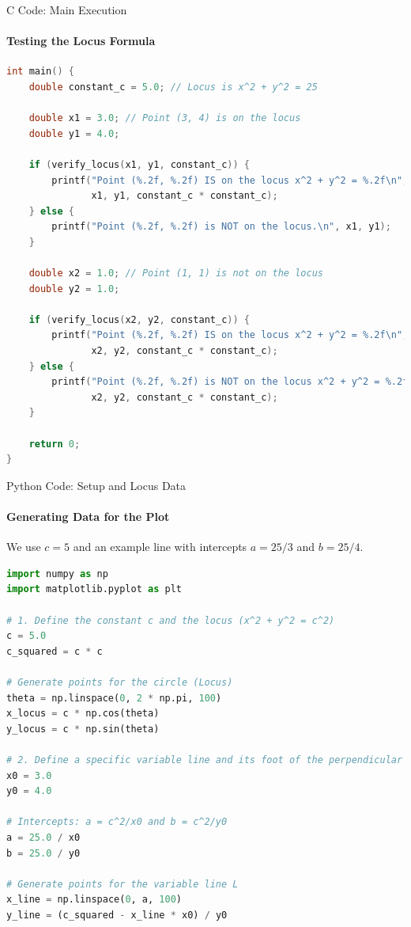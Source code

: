 \documentclass{beamer}
\begin{document}
\begin{frame}[fragile]{C Code: Main Execution}
    \framesubtitle{Testing the Locus Formula}
    
    \lstset{style=CStyle}
    \begin{lstlisting}[language=C, firstnumber=14]
int main() {
    double constant_c = 5.0; // Locus is x^2 + y^2 = 25

    double x1 = 3.0; // Point (3, 4) is on the locus
    double y1 = 4.0;
    
    if (verify_locus(x1, y1, constant_c)) {
        printf("Point (%.2f, %.2f) IS on the locus x^2 + y^2 = %.2f\n", 
               x1, y1, constant_c * constant_c);
    } else {
        printf("Point (%.2f, %.2f) is NOT on the locus.\n", x1, y1);
    }

    double x2 = 1.0; // Point (1, 1) is not on the locus
    double y2 = 1.0;

    if (verify_locus(x2, y2, constant_c)) {
        printf("Point (%.2f, %.2f) IS on the locus x^2 + y^2 = %.2f\n", 
               x2, y2, constant_c * constant_c);
    } else {
        printf("Point (%.2f, %.2f) is NOT on the locus x^2 + y^2 = %.2f\n", 
               x2, y2, constant_c * constant_c);
    }

    return 0;
}
    \end{lstlisting}
\end{frame}

\begin{frame}[fragile]{Python Code: Setup and Locus Data}
    \framesubtitle{Generating Data for the Plot}
    
    We use $c=5$ and an example line with intercepts $a=25/3$ and $b=25/4$.
    
    \lstset{style=PythonStyle}
    \begin{lstlisting}[language=Python]
import numpy as np
import matplotlib.pyplot as plt

# 1. Define the constant c and the locus (x^2 + y^2 = c^2)
c = 5.0
c_squared = c * c

# Generate points for the circle (Locus)
theta = np.linspace(0, 2 * np.pi, 100)
x_locus = c * np.cos(theta)
y_locus = c * np.sin(theta)

# 2. Define a specific variable line and its foot of the perpendicular P(x0, y0)
x0 = 3.0
y0 = 4.0

# Intercepts: a = c^2/x0 and b = c^2/y0
a = 25.0 / x0
b = 25.0 / y0

# Generate points for the variable line L
x_line = np.linspace(0, a, 100)
y_line = (c_squared - x_line * x0) / y0
    \end{lstlisting}
\end{frame}
\end{document}
